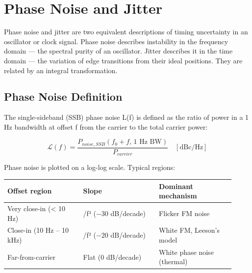 \section{Phase Noise and Jitter}\label{sec:wiki_phase_noise}



Phase noise and jitter are two equivalent descriptions of timing uncertainty in an oscillator or clock signal. Phase noise describes instability in the frequency domain — the spectral purity of an oscillator. Jitter describes it in the time domain — the variation of edge transitions from their ideal positions. They are related by an integral transformation.

      

\subsection{Phase Noise Definition}

      

The single-sideband (SSB) phase noise L(f) is defined as the ratio of power in a 1 Hz bandwidth at offset f from the carrier to the total carrier power:


      
\[\mathcal{L}(f) = \dfrac{P_{noise,SSB}(f_0+f,\,1\text{ Hz BW})}{P_{carrier}}\quad[\text{dBc/Hz}]\]

      

Phase noise is plotted on a log-log scale. Typical regions:

      
        
        
        
        
      

{\small\begin{longtable}{>{\raggedright\arraybackslash}p{0.307\linewidth}>{\raggedright\arraybackslash}p{0.307\linewidth}>{\raggedright\arraybackslash}p{0.307\linewidth}}
\hline
\textbf{Offset region} & \textbf{Slope} & \textbf{Dominant mechanism} \\
\hline
Very close-in (\textless{} 10 Hz) & 1/f³ (−30 dB/decade) & Flicker FM noise \\
Close-in (10 Hz – 10 kHz) & 1/f² (−20 dB/decade) & White FM, Leeson's model \\
Far-from-carrier & Flat (0 dB/decade) & White phase noise (thermal) \\
\hline
\end{longtable}}

